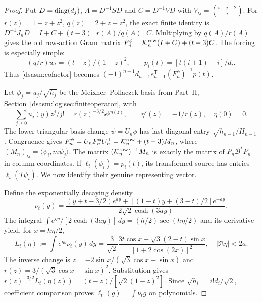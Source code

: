 \documentclass[11pt,letterpaper]{article}
\theoremstyle{remark}\newtheorem{remark}[theorem]{Remark}
\begin{document}
\begin{proof}
Put $D=\operatorname{diag}(d_j)$, $A=D^{-1}SD$ and
$C=D^{-1}VD$ with $V_{ij}=\binom{i+j+2}{i}$.
For $r(z)=1-z+z^2$, $q(z)=2+z-z^2$, the exact finite identity is
$D^{-1}J_nD=I+C+(t-3)[r(A)/q(A)]C$.
Multiplying by $q(A)/r(A)$ gives the old row-action Gram matrix
$F_n^\phi=\mathcal K_n^{\rm row}(I+C)+(t-3)C$.
The forcing is especially simple:
\[
 (q/r)w_t=(t-z)/(1-z)^2,\qquad
 p_i(t)=[t(i+1)-i]/d_i.
\]
Thus \eqref{dsasm:cofactor} becomes
$(-1)^{n-1}d_{n-1}e_{n-1}^{\mathsf T}(F_n^\phi)^{-1}p(t)$.

Let $\phi_j=u_j/\sqrt{h_j}$ be the Meixner--Pollaczek basis from
Part~II, Section~\ref{dsasm:log:sec:finiteoperator}, with
\[
 \sum_{j\ge0}u_j(y)z^j/j!=r(z)^{-3/2}e^{y\eta(z)},\qquad
 \eta'(z)=-1/r(z),\quad\eta(0)=0.
\]
The lower-triangular basis change $\psi=U_n\phi$ has last diagonal
entry $\sqrt{h_{n-1}/H_{n-1}}$. Congruence gives
$F_n^\psi=U_nF_n^\phi U_n^{\mathsf T}=\mathcal K_n^{\rm row}
+(t-3)M_n$, where $(M_n)_{ij}=\langle\psi_i,m\psi_j\rangle$.
The matrix $(\mathcal K_n^{\rm row})^{-1}M_n$ is exactly the matrix
of $P_n\mathcal B^*P_n$ in column coordinates. If
$\ell_t(\phi_i)=p_i(t)$, its transformed source has entries
$\ell_t(T\psi_i)$. We now identify their genuine representing vector.

Define the exponentially decaying density
\[
 \nu_t(y)=\frac{(y+t-3/2)e^{ay}+[(1-t)y+(3-t)/2]e^{-ay}}
                    {2\sqrt2\cosh(3ay)}.
\]
The integral
$\int e^{\eta y}/[2\cosh(3ay)]\,dy=(h/2)\sec(h\eta/2)$
and its derivative yield, for $x=h\eta/2$,
\begin{equation}\label{dsasm:Lsource}
 L_t(\eta):=\int e^{\eta y}\nu_t(y)\,dy
 =\frac3{\sqrt2}\frac{3t\cos x+\sqrt3(2-t)\sin x}
                            {[1+2\cos(2x)]^2},\quad |\Re\eta|<2a.
\end{equation}
The inverse change is
$z=-2\sin x/(\sqrt3\cos x-\sin x)$ and
$r(z)=3/(\sqrt3\cos x-\sin x)^2$.
Substitution gives
$r(z)^{-3/2}L_t(\eta(z))=(t-z)/[\sqrt2(1-z)^2]$.
Since $\sqrt{h_i}=i!d_i/\sqrt2$, coefficient comparison proves
$\ell_t(g)=\int\nu_tg$ on polynomials.


\end{proof}
\end{document}
